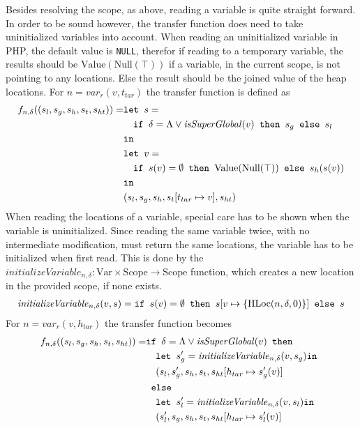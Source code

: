 Besides resolving the scope, as above, reading a variable is quite straight forward. In order to be sound however, the transfer function does need to take uninitialized variables into account. When reading an uninitialized variable in PHP, the default value is \texttt{NULL}, therefor if reading to a temporary variable, the results should be $\text{Value}(\text{Null}(\top))$ if a variable, in the current scope, is not pointing to any locations. Else the result should be the joined value of the heap locations. For $n = \mathit{var}_r(v,t_{tar})$ the transfer function is defined as
\begin{align}
f_{n, \delta} ((s_l,s_g,s_h,s_t, s_{ht})) = &\texttt{let } s = \notag\\
                                            &\quad\texttt{if }\delta = \Lambda \vee \mathit{isSuperGlobal}(v)\texttt{ then } s_g \texttt{ else } s_l\notag\\
                                            & \texttt{in }\notag\\
                                            &\texttt{let } v = \notag\\
                                            &\quad\texttt{if }s(v) = \emptyset\texttt{ then } \text{Value}(\text{Null}(\top)) \texttt{ else } s_h(s(v))\notag\\
                                            & \texttt{in }\notag\\
                                            &(s_l,s_g,s_h,s_t[t_{tar}\mapsto v], s_{ht})
\end{align}
When reading the locations of a variable, special care has to be shown when the variable is uninitialized. Since reading the same variable twice, with no intermediate modification, must return the same locations, the variable has to be initialized when first read. This is done by the $\mathit{initializeVariable}_{n,\delta} : \text{Var}\times\text{Scope}\rightarrow \text{Scope}$ function, which creates a new location in the provided scope, if none exists. 
\begin{align}
\mathit{initializeVariable}_{n, \delta}(v,s) = \texttt{if }s(v) = \emptyset\texttt{ then } s[v\mapsto \{\text{HLoc}(n,\delta, 0)\}] \texttt{ else } s
\end{align}
For $n = \mathit{var}_r(v,h_{tar})$ the transfer function becomes
\begin{align}
f_{n, \delta} ((s_l,s_g,s_h,s_t, s_{ht})) = &\texttt{if }\delta= \Lambda \vee \mathit{isSuperGlobal}(v)\texttt{ then } \notag\\
                                            &\quad\texttt{let }  s_g' = \mathit{initializeVariable}_{n,\delta}(v,s_g) \texttt{in }\notag\\
                                            &\quad (s_l, s_g', s_h, s_t, s_{ht}[h_{tar}\mapsto s_g'(v)]\notag\\
                                            & \texttt{ else } \notag\\
                                            &\quad\texttt{let }  s_l' = \mathit{initializeVariable}_{n,\delta}(v,s_l) \texttt{in }\notag\\
                                            &\quad (s_l', s_g, s_h, s_t, s_{ht}[h_{tar}\mapsto s_l'(v)]\notag\\
                                            &
\end{align}

